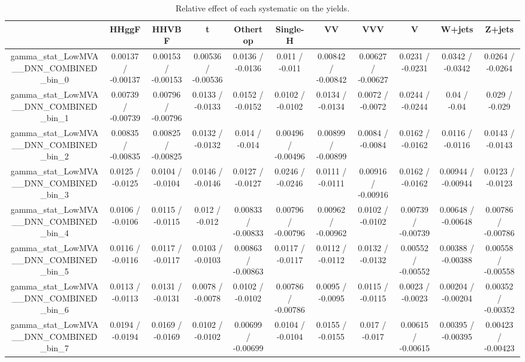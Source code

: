 \documentclass[10pt]{article}
\begin{document}
\begin{table}[htbp]
\begin{center}
\begin{tabular}{|c|c|c|c|c|c|c|c|c|c|c|}
\hline 
      & HHggF      & HHVBF      & t      & Othertop      & Single-H      & VV      & VVV      & V      & W+jets      & Z+jets \\ 
\hline 
  gamma_stat_LowMVA__DNN_COMBINED_bin_0 & 0.00137 / -0.00137 & 0.00153 / -0.00153 & 0.00536 / -0.00536 & 0.0136 / -0.0136 & 0.011 / -0.011 & 0.00842 / -0.00842 & 0.00627 / -0.00627 & 0.0231 / -0.0231 & 0.0342 / -0.0342 & 0.0264 / -0.0264 \\ 
  gamma_stat_LowMVA__DNN_COMBINED_bin_1 & 0.00739 / -0.00739 & 0.00796 / -0.00796 & 0.0133 / -0.0133 & 0.0152 / -0.0152 & 0.0102 / -0.0102 & 0.0134 / -0.0134 & 0.0072 / -0.0072 & 0.0244 / -0.0244 & 0.04 / -0.04 & 0.029 / -0.029 \\ 
  gamma_stat_LowMVA__DNN_COMBINED_bin_2 & 0.00835 / -0.00835 & 0.00825 / -0.00825 & 0.0132 / -0.0132 & 0.014 / -0.014 & 0.00496 / -0.00496 & 0.00899 / -0.00899 & 0.0084 / -0.0084 & 0.0162 / -0.0162 & 0.0116 / -0.0116 & 0.0143 / -0.0143 \\ 
  gamma_stat_LowMVA__DNN_COMBINED_bin_3 & 0.0125 / -0.0125 & 0.0104 / -0.0104 & 0.0146 / -0.0146 & 0.0127 / -0.0127 & 0.0246 / -0.0246 & 0.0111 / -0.0111 & 0.00916 / -0.00916 & 0.0162 / -0.0162 & 0.00944 / -0.00944 & 0.0123 / -0.0123 \\ 
  gamma_stat_LowMVA__DNN_COMBINED_bin_4 & 0.0106 / -0.0106 & 0.0115 / -0.0115 & 0.012 / -0.012 & 0.00833 / -0.00833 & 0.00796 / -0.00796 & 0.00962 / -0.00962 & 0.0102 / -0.0102 & 0.00739 / -0.00739 & 0.00648 / -0.00648 & 0.00786 / -0.00786 \\ 
  gamma_stat_LowMVA__DNN_COMBINED_bin_5 & 0.0116 / -0.0116 & 0.0117 / -0.0117 & 0.0103 / -0.0103 & 0.00863 / -0.00863 & 0.0117 / -0.0117 & 0.0112 / -0.0112 & 0.0132 / -0.0132 & 0.00552 / -0.00552 & 0.00388 / -0.00388 & 0.00558 / -0.00558 \\ 
  gamma_stat_LowMVA__DNN_COMBINED_bin_6 & 0.0113 / -0.0113 & 0.0131 / -0.0131 & 0.0078 / -0.0078 & 0.0102 / -0.0102 & 0.00786 / -0.00786 & 0.0095 / -0.0095 & 0.0115 / -0.0115 & 0.0023 / -0.0023 & 0.00204 / -0.00204 & 0.00352 / -0.00352 \\ 
  gamma_stat_LowMVA__DNN_COMBINED_bin_7 & 0.0194 / -0.0194 & 0.0169 / -0.0169 & 0.0102 / -0.0102 & 0.00699 / -0.00699 & 0.0104 / -0.0104 & 0.0155 / -0.0155 & 0.017 / -0.017 & 0.00615 / -0.00615 & 0.00395 / -0.00395 & 0.00423 / -0.00423 \\ 
\hline 
\end{tabular} 
\caption{Relative effect of each systematic on the yields.} 
\end{center} 
\end{table} 
\end{document}
